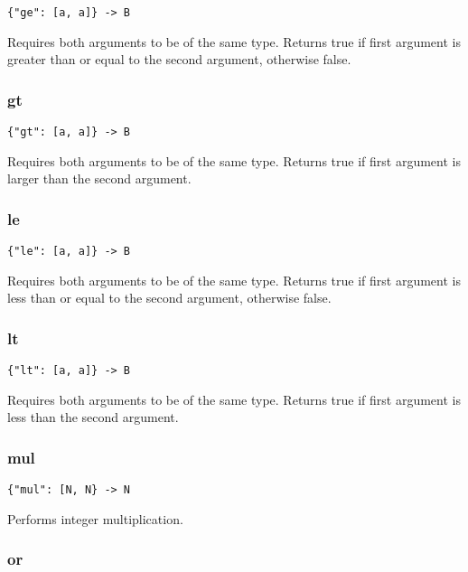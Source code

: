 \documentclass[a4paper]{article}
\begin{document}
\begin{verbatim}
{"ge": [a, a]} -> B
\end{verbatim}

Requires both arguments to be of the same type. Returns true if first
argument is greater than or equal to the second argument, otherwise
false.

\subsubsection{gt}

\begin{verbatim}
{"gt": [a, a]} -> B
\end{verbatim}

Requires both arguments to be of the same type. Returns true if first
argument is larger than the second argument.

\subsubsection{le}

\begin{verbatim}
{"le": [a, a]} -> B
\end{verbatim}

Requires both arguments to be of the same type. Returns true if first
argument is less than or equal to the second argument, otherwise
false.

\subsubsection{lt}

\begin{verbatim}
{"lt": [a, a]} -> B
\end{verbatim}

Requires both arguments to be of the same type. Returns true if first
argument is less than the second argument.

\subsubsection{mul}

\begin{verbatim}
{"mul": [N, N} -> N
\end{verbatim}

Performs integer multiplication.

\subsubsection{or}
\end{document}
